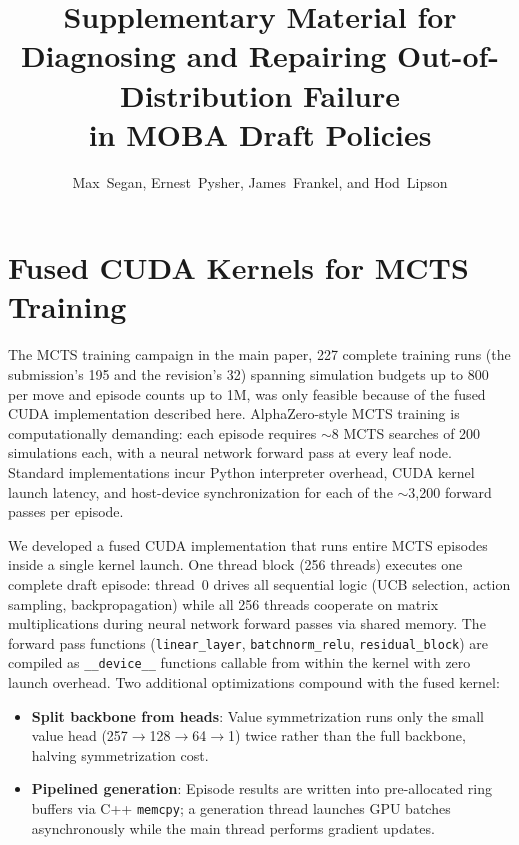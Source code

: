 \documentclass[journal]{IEEEtran}
\newif\ifanonymous
\begin{document}
\title{Supplementary Material for\\ Diagnosing and Repairing Out-of-Distribution Failure\\ in MOBA Draft Policies}
\ifanonymous
\author{Anonymous Authors}
\else
\author{Max~Segan, Ernest~Pysher, James~Frankel, and Hod~Lipson}
\fi
\maketitle

\section{Fused CUDA Kernels for MCTS Training}
\label{sec:cuda}

The MCTS training campaign in the main paper, 227 complete training runs (the submission's 195 and the revision's 32) spanning simulation budgets up to 800 per move and episode counts up to 1M, was only feasible because of the fused CUDA implementation described here. AlphaZero-style MCTS training is computationally demanding: each episode requires $\sim$8 MCTS searches of 200 simulations each, with a neural network forward pass at every leaf node. Standard implementations incur Python interpreter overhead, CUDA kernel launch latency, and host-device synchronization for each of the $\sim$3,200 forward passes per episode.

We developed a fused CUDA implementation that runs entire MCTS episodes inside a single kernel launch. One thread block (256 threads) executes one complete draft episode: thread~0 drives all sequential logic (UCB selection, action sampling, backpropagation) while all 256 threads cooperate on matrix multiplications during neural network forward passes via shared memory. The forward pass functions (\texttt{linear\_layer}, \texttt{batchnorm\_relu}, \texttt{residual\_block}) are compiled as \texttt{\_\_device\_\_} functions callable from within the kernel with zero launch overhead. Two additional optimizations compound with the fused kernel:
\begin{itemize}
    \item \textbf{Split backbone from heads}: Value symmetrization runs only the small value head (257$\to$128$\to$64$\to$1) twice rather than the full backbone, halving symmetrization cost.
    \item \textbf{Pipelined generation}: Episode results are written into pre-allocated ring buffers via C++ \texttt{memcpy}; a generation thread launches GPU batches asynchronously while the main thread performs gradient updates.
\end{itemize}
\end{document}
